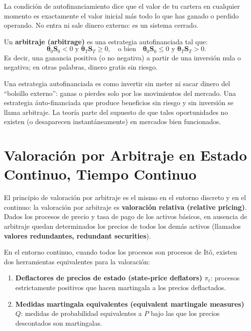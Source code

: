 \documentclass[12pt]{article}
\begin{document}
\begin{intuicionmat}
La condici\'on de autofinanciamiento dice que el valor de tu cartera en cualquier momento es exactamente el valor inicial m\'as todo lo que has ganado o perdido operando. No entra ni sale dinero externo: es un sistema cerrado.
\end{intuicionmat}

Un \textbf{arbitraje (arbitrage)} es una estrategia autofinanciada tal que:
\[
  \boldsymbol{\theta}_0 \mathbf{S}_0 < 0 \text{ y } \boldsymbol{\theta}_T \mathbf{S}_T \geq 0, \quad \text{o bien} \quad \boldsymbol{\theta}_0 \mathbf{S}_0 \leq 0 \text{ y } \boldsymbol{\theta}_T \mathbf{S}_T > 0.
\]
Es decir, una ganancia positiva (o no negativa) a partir de una inversi\'on nula o negativa; en otras palabras, dinero gratis sin riesgo.

\begin{intuicion}
Una estrategia autofinanciada es como invertir sin meter ni sacar dinero del ``bolsillo externo'': ganas o pierdes solo por los movimientos del mercado. Una estrategia \'auto-financiada que produce beneficios sin riesgo y sin inversi\'on se llama arbitraje. La teor\'ia parte del supuesto de que tales oportunidades no existen (o desaparecen instant\'aneamente) en mercados bien funcionados.
\end{intuicion}

\section{Valoraci\'on por Arbitraje en Estado Continuo, Tiempo Continuo}

El principio de valoraci\'on por arbitraje es el mismo en el entorno discreto y en el continuo: la valoraci\'on por arbitraje es \textbf{valoraci\'on relativa (relative pricing)}. Dados los procesos de precio y tasa de pago de los activos b\'asicos, en ausencia de arbitraje quedan determinados los precios de todos los dem\'as activos (llamados \textbf{valores redundantes, redundant securities}).

En el entorno continuo, cuando todos los procesos son procesos de It\^o, existen dos herramientas equivalentes para la valoraci\'on:

\begin{enumerate}
  \item \textbf{Deflactores de precios de estado (state-price deflators)} $\pi_t$: procesos estrictamente positivos que hacen martingala a los precios deflactados.
  \item \textbf{Medidas martingala equivalentes (equivalent martingale measures)} $Q$: medidas de probabilidad equivalentes a $P$ bajo las que los precios descontados son martingalas.
\end{enumerate}
\end{document}

